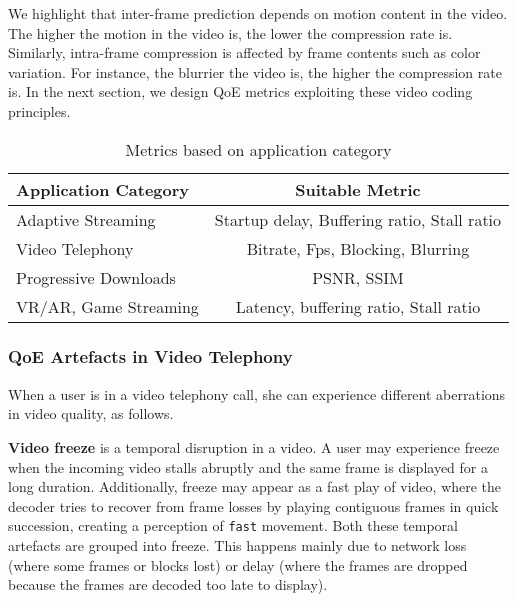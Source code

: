 We highlight that inter-frame prediction depends on motion content in the video. The higher the motion in the video is, the lower the compression rate is. Similarly, intra-frame compression is affected by frame contents such as color variation. For instance, the blurrier the video is, the higher the compression rate is. In the next section, we design QoE metrics exploiting these video coding principles.

\begin{table}[t]
	\centering
			\begin{tabular}{l|c}				
				\hline \hline
				\textbf{Application Category} & \textbf{Suitable Metric} \\
				\hline
				\hline
				Adaptive Streaming & Startup delay, Buffering ratio, Stall ratio \\ \hline
				Video Telephony & Bitrate, Fps, Blocking, Blurring \\ \hline
				Progressive Downloads & PSNR, SSIM \\ \hline
				VR/AR, Game Streaming & Latency, buffering ratio, Stall ratio \\ \hline 
			\end{tabular}
		\hfill 
		\caption{Metrics based on application category}
		\label{tab:qoe_metric}
\end{table}

\subsubsection{QoE Artefacts in Video Telephony}

When a user is in a video telephony call, she can experience different aberrations in video quality, as follows.

\noindent \textbf{Video freeze} is a temporal disruption in a video. A user may experience freeze when the incoming video stalls abruptly and the same frame is displayed for a long duration. Additionally, freeze may appear as a fast play of video, where the decoder tries to recover from frame losses by playing contiguous frames in quick succession, creating a perception of \texttt{fast} movement. Both these temporal artefacts are grouped into freeze. 
This happens mainly due to network loss (where some frames or blocks lost) or delay (where the frames are dropped because the frames are decoded too late to display). 

